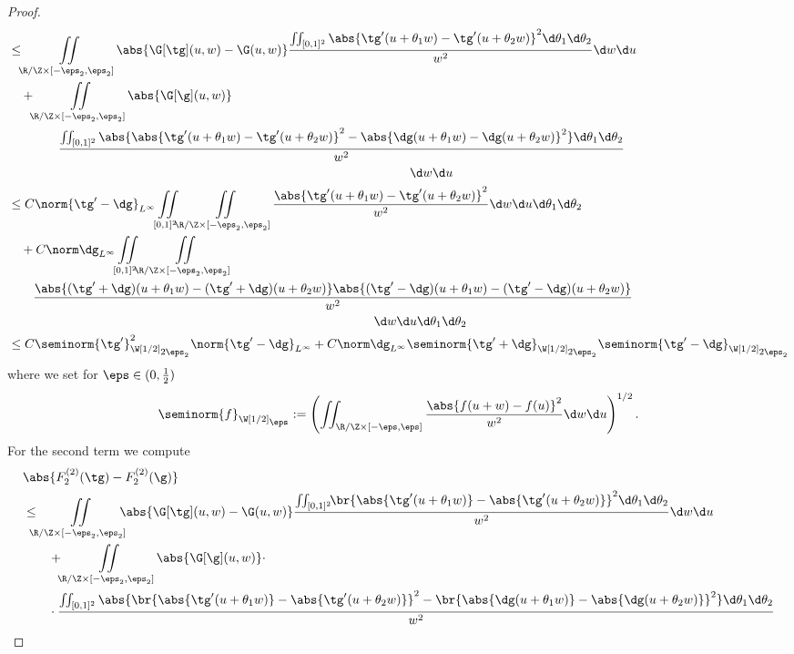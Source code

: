 \begin{proof}
\begin{align*}
  &\le \iint\limits_{\R/\Z\times[-\eps_2,\eps_2]}\abs{\G[\gt](u,w)-\G(u,w)}\frac{\iint_{[0,1]^2}\abs{\dgt(u+\theta_1w)-\dgt(u+\theta_2w)}^2\d\theta_1\d\theta_2}{w^2}\d w\d u \\
  &\quad{}+\iint\limits_{\R/\Z\times[-\eps_2,\eps_2]}\abs{\G[\g](u,w)}\\
  & \qquad \qquad  \frac{\iint_{[0,1]^2}\abs{\abs{\dgt(u+\theta_1w)-\dgt(u+\theta_2w)}^2-\abs{\dg(u+\theta_1w)-\dg(u+\theta_2w)}^2}\d\theta_1\d\theta_2}{w^2} \\
  & \hspace{11.2cm}\d w\d u \\
  &\le C\norm{\dgt-\dg}_{L^\infty}\iint\limits_{[0,1]^2}\iint\limits_{\R/\Z\times[-\eps_2,\eps_2]}\frac{\abs{\dgt(u+\theta_1w)-\dgt(u+\theta_2w)}^2}{w^2}\d w\d u\d\theta_1\d\theta_2 \\
  &\quad{}+C\norm\dg_{L^{\infty}}\iint\limits_{[0,1]^2}\iint\limits_{\R/\Z\times[-\eps_2,\eps_2]} \\
  & \qquad  \frac{\abs{(\dgt+\dg)(u+\theta_1w)-(\dgt+\dg)(u+\theta_2w)}\abs{(\dgt-\dg)(u+\theta_1w)-(\dgt-\dg)(u+\theta_2w)}}{w^2} \\
  & \hspace{10.2cm}\d w\d u\d\theta_1\d\theta_2 \\
  &\le C\seminorm{\dgt}_{\W[1/2]_{\scriptstyle 2\eps_2}}^2\norm{\dgt-\dg}_{L^\infty}
    + C \norm\dg_{L^{\infty}}\seminorm{\dgt+\dg}_{\W[1/2]_{\scriptstyle 2\eps_2}}\seminorm{\dgt-\dg}_{\W[1/2]_{\scriptstyle 2\eps_2}}
 \end{align*}
 where we set for $\eps\in(0,\tfrac12)$
 \begin{equation*}
  \seminorm{f}_{\W[1/2]_{\scriptstyle\eps}}
  := \left( \iint_{\R/\Z\times[-\eps,\eps]} \frac{\abs{f(u+w)-f(u)}^2}{w^{2}} \d w\d u\right)^{1/2}.
 \end{equation*}
 For the second term we compute
 \begin{align*}
  &\abs{F_2^{(2)}(\gt)-F_2^{(2)}(\g)} \\
  &\le \! \! \iint\limits_{\R/\Z\times[-\eps_2,\eps_2]} \! \! \! \!\abs{\G[\gt](u,w)-\G(u,w)}\frac{\iint_{[0,1]^2} \!\! \br{\abs{\dgt(u+\theta_1w)}-\abs{\dgt(u+\theta_2w)}}^2\d\theta_1\d\theta_2}{w^2}\d w\d u \\
  &\qquad{}+\iint\limits_{\R/\Z\times[-\eps_2,\eps_2]}\abs{\G[\g](u,w)} \cdot\\
  &\qquad \cdot\frac{\iint_{[0,1]^2}\abs{\br{\abs{\dgt(u+\theta_1w)}-\abs{\dgt(u+\theta_2w)}}^2-\br{\abs{\dg(u+\theta_1w)}-\abs{\dg(u+\theta_2w)}}^2}\d\theta_1\d\theta_2}{w^2}\\

\end{align*}
\end{proof}
